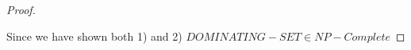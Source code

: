 \documentclass[11pt]{article}
\begin{document}
\begin{proof}
\begin{enumerate}[label=\alph*)]
\end{enumerate}

Since we have shown both 1) and 2) $DOMINATING-SET \in NP-Complete$

\end{proof}
\end{document}
